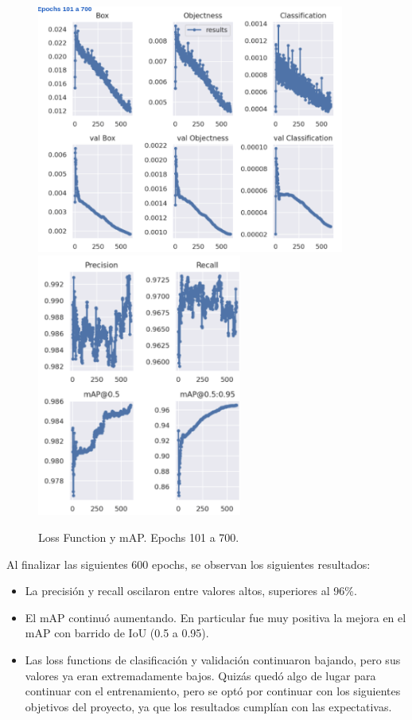 \begin{figure}
    \centering
    \includegraphics[width=0.9\textwidth]{img/resultados_finales_700_part1.png}
    \includegraphics[width=0.6\textwidth]{img/resultados_finales_700_part2.png}
    \caption{Loss Function y mAP. Epochs 101 a 700.}
    \label{fig:loss-functions-map-700}
\end{figure}
Al finalizar las siguientes 600 epochs, se observan los siguientes resultados:
\begin{itemize}
    \item La precisión y recall oscilaron entre valores altos, superiores al 96\%.
    \item El mAP continuó aumentando. En particular fue muy positiva la mejora en el mAP con barrido de IoU (0.5 a 0.95).
    \item Las loss functions de clasificación y validación continuaron bajando, pero sus valores ya eran extremadamente bajos. Quizás quedó algo de lugar para continuar con el entrenamiento, pero se optó por continuar con los siguientes objetivos del proyecto, ya que los resultados cumplían con las expectativas.
\end{itemize}

